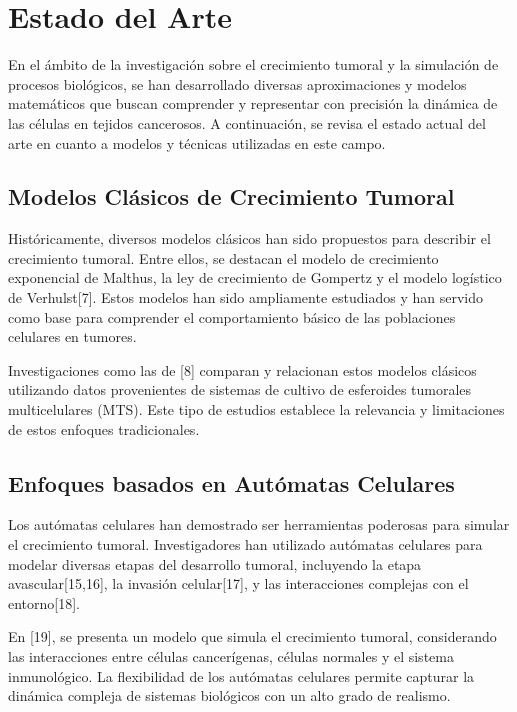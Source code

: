 \chapter{Estado del Arte}\label{chapter:state-of-the-art}

En el ámbito de la investigación sobre el crecimiento tumoral y la simulación de procesos biológicos, se han desarrollado diversas aproximaciones y modelos matemáticos que buscan comprender y representar con precisión la dinámica de las células en tejidos cancerosos. A continuación, se revisa el estado actual del arte en cuanto a modelos y técnicas utilizadas en este campo.

\section{Modelos Clásicos de Crecimiento Tumoral}

Históricamente, diversos modelos clásicos han sido propuestos para describir el crecimiento tumoral. Entre ellos, se destacan el modelo de crecimiento exponencial de Malthus, la ley de crecimiento de Gompertz y el modelo logístico de Verhulst[7]. Estos modelos han sido ampliamente estudiados y han servido como base para comprender el comportamiento básico de las poblaciones celulares en tumores.

Investigaciones como las de [8] comparan y relacionan estos modelos clásicos utilizando datos provenientes de sistemas de cultivo de esferoides tumorales multicelulares (MTS). Este tipo de estudios establece la relevancia y limitaciones de estos enfoques tradicionales.

\section{Enfoques basados en Autómatas Celulares}

Los autómatas celulares han demostrado ser herramientas poderosas para simular el crecimiento tumoral. Investigadores han utilizado autómatas celulares para modelar diversas etapas del desarrollo tumoral, incluyendo la etapa avascular[15,16], la invasión celular[17], y las interacciones complejas con el entorno[18].

En [19], se presenta un modelo que simula el crecimiento tumoral, considerando las interacciones entre células cancerígenas, células normales y el sistema inmunológico. La flexibilidad de los autómatas celulares permite capturar la dinámica compleja de sistemas biológicos con un alto grado de realismo.

